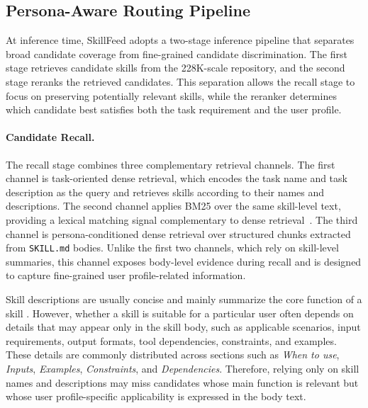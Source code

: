 \documentclass[letterpaper]{article} %
\begin{document}



\subsection{Persona-Aware Routing Pipeline}
\label{subsection:two_stage_inference}

At inference time, SkillFeed adopts a two-stage inference pipeline that separates broad candidate coverage from fine-grained candidate discrimination.
The first stage retrieves candidate skills from the 228K-scale repository, and the second stage reranks the retrieved candidates.
This separation allows the recall stage to focus on preserving potentially relevant skills, while the reranker determines which candidate best satisfies both the task requirement and the user profile.

\paragraph{Candidate Recall.}
The recall stage combines three complementary retrieval channels.
The first channel is task-oriented dense retrieval, which encodes the task name and task description as the query and retrieves skills according to their names and descriptions.
The second channel applies BM25 over the same skill-level text, providing a lexical matching signal complementary to dense retrieval~\citep{robertson2009bm25}.
The third channel is persona-conditioned dense retrieval over structured chunks extracted from \texttt{SKILL.md} bodies.
Unlike the first two channels, which rely on skill-level summaries, this channel exposes body-level evidence during recall and is designed to capture fine-grained user profile-related information.

Skill descriptions are usually concise and mainly summarize the core function of a skill \cite{openai2026skills}.
However, whether a skill is suitable for a particular user often depends on details that may appear only in the skill body, such as applicable scenarios, input requirements, output formats, tool dependencies, constraints, and examples.
These details are commonly distributed across sections such as \textit{When to use}, \textit{Inputs}, \textit{Examples}, \textit{Constraints}, and \textit{Dependencies}.
Therefore, relying only on skill names and descriptions may miss candidates whose main function is relevant but whose user profile-specific applicability is expressed in the body text.
\end{document}
